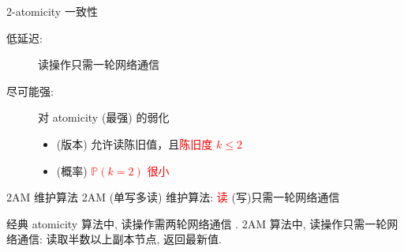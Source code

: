 \begin{frame}{2-atomicity 一致性}

  \begin{center}
  \end{center}

  \begin{cdef}
    \begin{description}
      \item[低延迟:] 读操作只需一轮网络通信
      \item[尽可能强:] 对 atomicity (最强) 的弱化
    \begin{itemize}
      \item (版本) 允许读陈旧值，且\textcolor{red}{陈旧度 $k \le 2$}
      \item (概率) \textcolor{red}{$\mathbb{P}(k = 2)$ 很小}
    \end{itemize}
    \end{description}
  \end{cdef}
\end{frame}


\begin{frame}{2AM 维护算法}
  2AM (单写多读) 维护算法: \textcolor{red}{读} (写)只需一轮网络通信

  {经典 atomicity 算法中, 读操作需两轮网络通信  
  . 2AM 算法中, 读操作只需一轮网络通信: 
读取半数以上副本节点, 返回最新值.}
\end{frame}


